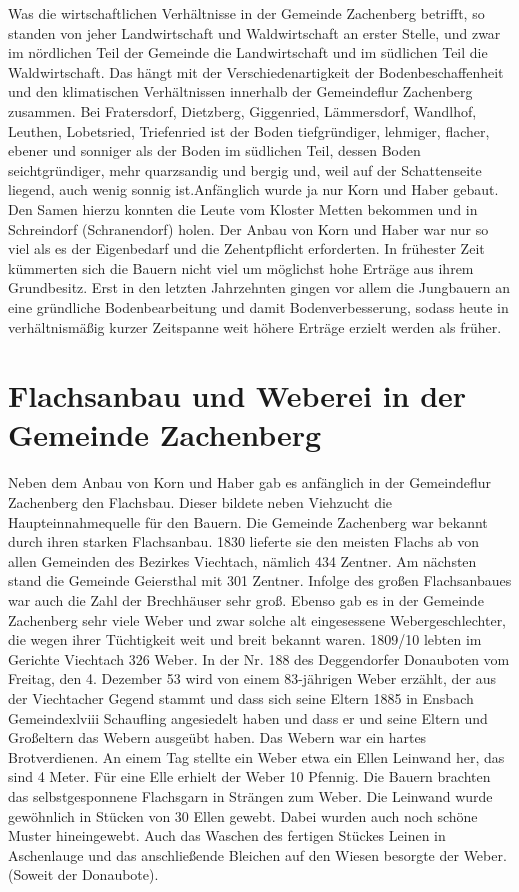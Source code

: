 \documentclass{book}
\begin{document}
Was die wirtschaftlichen Verhältnisse in der Gemeinde Zachenberg betrifft, so
standen von jeher Landwirtschaft und Waldwirtschaft an erster Stelle, und zwar
im nördlichen Teil der Gemeinde die Landwirtschaft und im südlichen Teil die
Waldwirtschaft. Das hängt mit der Verschiedenartigkeit der Bodenbeschaffenheit
und den klimatischen Verhältnissen innerhalb der Gemeindeflur Zachenberg
zusammen. Bei Fratersdorf, Dietzberg, Giggenried, Lämmersdorf, Wandlhof,
Leuthen, Lobetsried, Triefenried ist der Boden tiefgründiger, lehmiger, flacher,
ebener und sonniger als der Boden im südlichen Teil, dessen Boden
seichtgründiger, mehr quarzsandig und bergig und, weil auf der Schattenseite
liegend, auch wenig sonnig ist.Anfänglich wurde ja nur Korn und Haber gebaut.
Den Samen hierzu konnten die Leute vom Kloster Metten bekommen und in
Schreindorf (Schranendorf) holen. Der Anbau von Korn und Haber war nur so viel
als es der Eigenbedarf und die Zehentpflicht erforderten. In frühester Zeit
kümmerten sich die Bauern nicht viel um möglichst hohe Erträge aus ihrem
Grundbesitz. Erst in den letzten Jahrzehnten gingen vor allem die Jungbauern an
eine gründliche Bodenbearbeitung und damit Bodenverbesserung, sodass heute in
verhältnismäßig kurzer Zeitspanne weit höhere Erträge erzielt werden als früher.

\section{Flachsanbau und Weberei in der Gemeinde Zachenberg}

Neben dem Anbau von Korn und Haber gab es anfänglich in der Gemeindeflur
Zachenberg den Flachsbau. Dieser bildete neben Viehzucht die Haupteinnahmequelle
für den Bauern. Die Gemeinde Zachenberg war bekannt durch ihren starken
Flachsanbau. 1830 lieferte sie den meisten Flachs ab von allen Gemeinden des
Bezirkes Viechtach, nämlich 434 Zentner. Am nächsten stand die Gemeinde
Geiersthal mit 301 Zentner. Infolge des großen Flachsanbaues war auch die Zahl
der Brechhäuser sehr groß. Ebenso gab es in der Gemeinde Zachenberg sehr viele
Weber und zwar solche alt eingesessene Webergeschlechter, die wegen ihrer
Tüchtigkeit weit und breit bekannt waren. 1809/10 lebten im Gerichte Viechtach
326 Weber. In der Nr. 188 des Deggendorfer Donauboten vom Freitag, den 4.
Dezember 53 wird von einem 83-jährigen Weber erzählt, der aus der Viechtacher
Gegend stammt und dass sich seine Eltern 1885 in Ensbach Gemeindexlviii
Schaufling angesiedelt haben und dass er und seine Eltern und Großeltern das
Webern ausgeübt haben. Das Webern war ein hartes Brotverdienen. An einem Tag
stellte ein Weber etwa ein Ellen Leinwand her, das sind 4 Meter. Für eine Elle
erhielt der Weber 10 Pfennig. Die Bauern brachten das selbstgesponnene
Flachsgarn in Strängen zum Weber. Die Leinwand wurde gewöhnlich in Stücken von
30 Ellen gewebt. Dabei wurden auch noch schöne Muster hineingewebt. Auch das
Waschen des fertigen Stückes Leinen in Aschenlauge und das anschließende
Bleichen auf den Wiesen besorgte der Weber. (Soweit der Donaubote).
\end{document}
